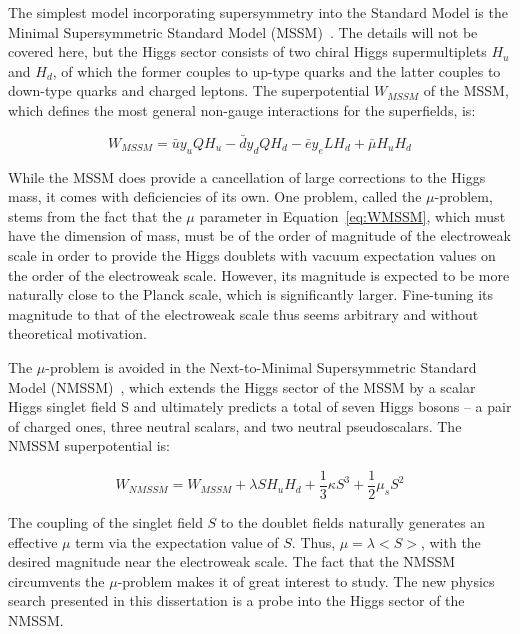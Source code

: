 The simplest model incorporating supersymmetry into the Standard Model is the Minimal Supersymmetric Standard Model (MSSM)~\cite{Martin:1997ns}. The details will not be covered here, but the Higgs sector consists of two chiral Higgs supermultiplets $H_u$ and $H_d$, of which the former couples to up-type quarks and the latter couples to down-type quarks and charged leptons. The superpotential $W_{MSSM}$ of the MSSM, which defines the most general non-gauge interactions for the superfields, is:

\begin{equation}
W_{MSSM} = \bar{u}y_{u}QH_{u} - \bar{d}y_{d}QH_{d} - \bar{e}y_{e}LH_{d} + \bar{\mu}H_{u}H_{d}
\label{eq:WMSSM}
\end{equation}

While the MSSM does provide a cancellation of large corrections to the Higgs mass, it comes with deficiencies of its own. One problem, called the $\mu$-problem, stems from the fact that the $\mu$ parameter in Equation~\ref{eq:WMSSM}, which must have the dimension of mass, must be of the order of magnitude of the electroweak scale in order to provide the Higgs doublets with vacuum expectation values on the order of the electroweak scale. However, its magnitude is expected to be more naturally close to the Planck scale, which is significantly larger. Fine-tuning its magnitude to that of the electroweak scale thus seems arbitrary and without theoretical motivation.

The $\mu$-problem is avoided in the Next-to-Minimal Supersymmetric Standard Model (NMSSM)~\cite{Maniatis:2009re}, which extends the Higgs sector of the MSSM by a scalar Higgs singlet field S and ultimately predicts a total of seven Higgs bosons -- a pair of charged ones, three neutral scalars, and two neutral pseudoscalars. The NMSSM superpotential is:

\begin{equation}
W_{NMSSM} = W_{MSSM} + \lambda SH_{u}H_{d} + \frac{1}{3}\kappa S^3 + \frac{1}{2}\mu_{s}S^2
\label{eq:WNMSSM}
\end{equation}

The coupling of the singlet field $S$ to the doublet fields naturally generates an effective $\mu$ term via the expectation value of $S$. Thus, $\mu = \lambda$$<S>$, with the desired magnitude near the electroweak scale. The fact that the NMSSM circumvents the $\mu$-problem makes it of great interest to study. The new physics search presented in this dissertation is a probe into the Higgs sector of the NMSSM.